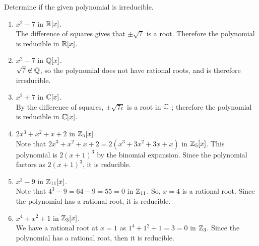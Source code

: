 \documentclass[../hw5]{subfiles}
\begin{document}
\begin{problem}
Determine if the given polynomial is irreducible.
\begin{enumerate}[label=\alph*)]
	\item $x^2-7$ in $\mathbb{R}[x]$. \\
	      The difference of squares gives that $ \pm \sqrt{7}$ is a root. Therefore the polynomial is reducible in $\mathbb{R}[x]$.
	\item $x^2-7$ in $\mathbb{Q}[x]$. \\
	      $\sqrt{7} \not\in \mathbb{Q}$, so the polynomial does not have rational roots, and is therefore irreducible.
	\item  $x^2 + 7$ in $\mathbb{C}[x]$. \\
	      By the difference of squares, $ \pm \sqrt{7i} $ is a root in $\mathbb{C}$ ; therefore the polynomial is reducible in $\mathbb{C}[x]$.
	\item $2x^3 + x^2 + x + 2$ in $\mathbb{Z}_5[x]$. \\
	      Note that $2x^3 + x^2 + x + 2 = 2(x^3 + 3x^2 + 3x + x)$ in $\mathbb{Z}_5[x]$.
	      This polynomial is $2(x+1)^3$ by the binomial expansion.
	      Since the polynomial factors as $2(x+1)^3$, it is reducible.
	\item $x^3-9$ in $\mathbb{Z}_{11}[x]$. \\
	      Note that $4^3-9= 64-9 = 55 = 0$ in $\mathbb{Z}_{11}$.
	      So, $x=4$ is a rational root.
	      Since the polynomial has a rational root, it is reducible.
	\item $x^4+x^2+1$ in $\mathbb{Z}_3[x]$. \\
	      We have a rational root at $x=1$ as  $1^4+1^2+1 = 3 = 0$ in  $\mathbb{Z}_3$.
	      Since the polynomial has a rational root, then it is reducible.
\end{enumerate}
\end{problem}
\end{document}

